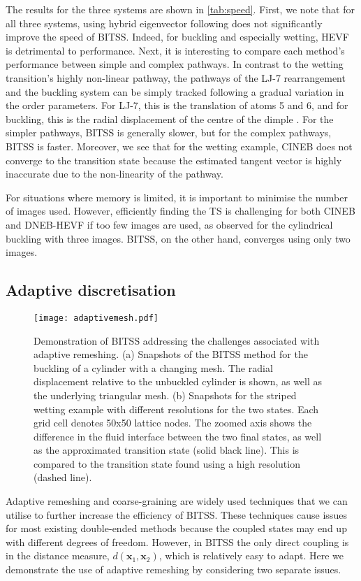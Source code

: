 \documentclass[aip,jcp,reprint,twocolumn]{revtex4-1}
\begin{document}
The results for the three systems are shown in \cref{tab:speed}.
First, we note that for all three systems, using hybrid eigenvector following does not significantly improve the speed of BITSS.
Indeed, for buckling and especially wetting, HEVF is detrimental to performance.
Next, it is interesting to compare each method's performance between simple and complex pathways.
In contrast to the wetting transition's highly non-linear pathway, the pathways of the LJ-7 rearrangement and the buckling system can be simply tracked following a gradual variation in the order parameters.
For LJ-7, this is the translation of atoms 5 and 6, and for buckling, this is the radial displacement of the centre of the dimple \cite{Panter2019}.
For the simpler pathways, BITSS is generally slower, but for the complex pathways, BITSS is faster.
Moreover, we see that for the wetting example, CINEB does not converge to the transition state because the estimated tangent vector is highly inaccurate due to the non-linearity of the pathway.

For situations where memory is limited, it is important to minimise the number of images used.
However, efficiently finding the TS is challenging for both CINEB and DNEB-HEVF if too few images are used, as observed for the cylindrical buckling with three images.
BITSS, on the other hand, converges using only two images.


\subsection{Adaptive discretisation}\label{sec:adaptive}
\begin{figure}[tb]
  \texttt{[image: adaptivemesh.pdf]}
  \caption{\label{fig:adaptivemesh}
    Demonstration of BITSS addressing the challenges associated with adaptive remeshing.
    (a) Snapshots of the BITSS method for the buckling of a cylinder with a changing mesh.
        The radial displacement relative to the unbuckled cylinder is shown, as well as the underlying triangular mesh.
    (b) Snapshots for the striped wetting example with different resolutions for the two states.
        Each grid cell denotes 50x50 lattice nodes.
        The zoomed axis shows the difference in the fluid interface between the two final states, as well as the approximated transition state (solid black line).
        This is compared to the transition state found using a high resolution (dashed line).
  }
\end{figure}

Adaptive remeshing and coarse-graining are widely used techniques that we can utilise to further increase the efficiency of BITSS.
These techniques cause issues for most existing double-ended methods because the coupled states may end up with different degrees of freedom.
However, in BITSS the only direct coupling is in the distance measure, $d(\bm{x}_1,\bm{x}_2)$, which is relatively easy to adapt.
Here we demonstrate the use of adaptive remeshing by considering two separate issues.
\end{document}
